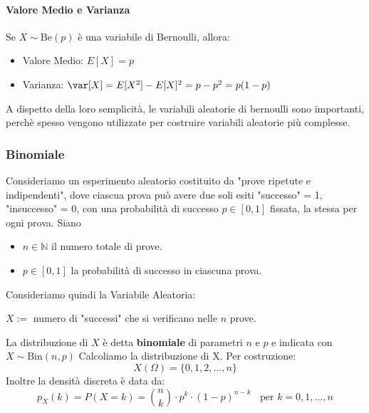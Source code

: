 	\paragraph{Valore Medio e Varianza}
	Se $X \sim \text{Be}(p)$ è una variabile di Bernoulli, allora:
	\begin{itemize}
		\item Valore Medio: $E[X] = p$
		\item Varianza: $\var[X] = E[X^2] - E[X]^2 = p-p^2 = p(1-p)$
	\end{itemize}
	A dispetto della loro semplicità, le variabili aleatorie di bernoulli sono importanti, perchè spesso
	vengono utilizzate per costruire variabili aleatorie più complesse.

	\subsubsection{Binomiale}
	Consideriamo un esperimento aleatorio costituito da "prove ripetute e indipendenti",
	dove ciascua prova può avere due soli esiti "successo" = 1, "insuccesso" = 0, con una
	probabilità di successo $p \in [0,1]$ fissata, la stessa per ogni prova.
	Siano \begin{itemize}
		\item $n \in \mathbb{N}$ il numero totale di prove.
		\item $p \in [0,1]$ la probabilità di successo in ciascuna prova.
	\end{itemize}
	Consideriamo quindi la Variabile Aleatoria:
	\begin{center}
		$X:=$ numero di "successi" che si verificano nelle $n$ prove.
	\end{center}
	La distribuzione di $X$ è detta \textbf{binomiale} di parametri $n$ e $p$ e indicata con $X \sim \text{Bin}(n,p)$
	Calcoliamo la distribuzione di X. Per costruzione:
	\[
		X(\Omega) = \{0,1,2,\dots,n\}
	\]
	Inoltre la densità discreta è data da:
	\begin{equation*}
		p_X (k) = P(X=k) = \binom{n}{k} \cdot p^k \cdot (1-p)^{n-k} \;\;\text{ per } k = 0,1,\dots, n
	\end{equation*}
